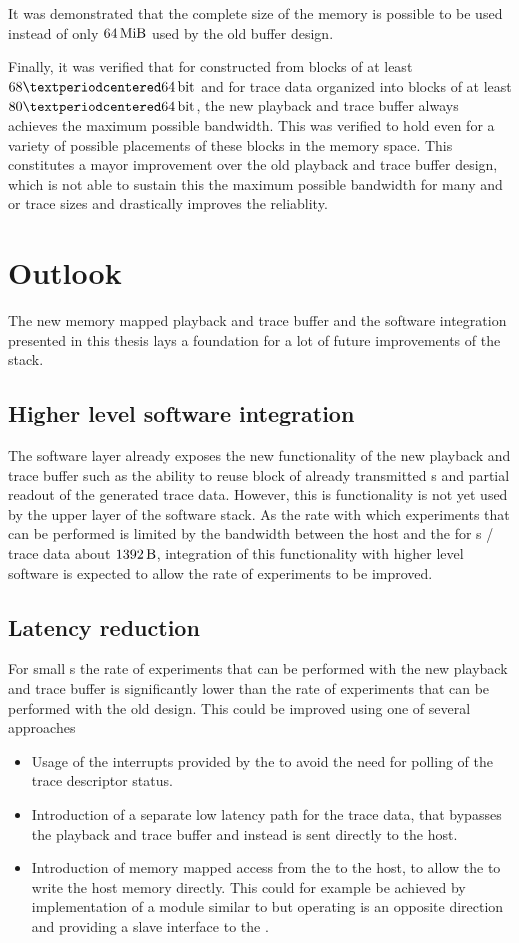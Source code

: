 It was demonstrated that the complete size of the \DDR{} memory is possible to be used instead of only $\SI{64}{\mebi\byte}$ used by the old buffer design.

Finally, it was verified that for \PlaybackProgram{} constructed from blocks of at least $\num{68}·\PhyWordSize{}$ and for trace data organized into blocks of at least $\num{80}·\PhyWordSize{}$, the new playback and trace buffer always achieves the maximum possible bandwidth. This was verified to hold even for a variety of possible placements of these blocks in the \DDR{} memory space.
This constitutes a mayor improvement over the old playback and trace buffer design, which is not able to sustain this the maximum possible bandwidth for many \PlaybackProgram{} and or trace sizes and drastically improves the reliablity.

\section{Outlook}
The new memory mapped playback and trace buffer and the software integration presented in this thesis lays a foundation for a lot of future improvements of the \BSS{} stack.
\subsection{Higher level software integration}
The \ayo{} software layer already exposes the new functionality of the new playback and trace buffer such as the ability to reuse block of already transmitted \PlaybackProgram{}s and partial readout of the generated trace data. However, this is functionality is not yet used by the upper layer of the \BSS{} software stack. As the rate with which experiments that can be performed is limited by the bandwidth between the host and the \FPGA{} for \PlaybackProgram{}s / trace data about $\SI{1392}{\byte}$, integration of this functionality with higher level software is expected to allow the rate of experiments to be improved.
\subsection{Latency reduction}
For small \PlaybackProgram{}s the rate of experiments that can be performed with the new playback and trace buffer is significantly lower than the rate of experiments that can be performed with the old design. This could be improved using one of several approaches
\begin{itemize}
\item Usage of the interrupts provided by the \AXIDMA{} to avoid the need for polling of the trace descriptor status.
\item Introduction of a separate low latency path for the trace data, that bypasses the playback and trace buffer and instead is sent directly to the host.
\item Introduction of memory mapped access from the \FPGA{} to the host, to allow the \FPGA{} to write the host memory directly. This could for example be achieved by implementation of a module similar to \FAXI{} but operating is an opposite direction and providing a \AXI{} slave interface to the \FPGA{}.
\end{itemize}
